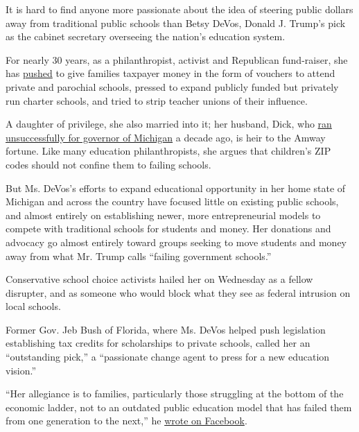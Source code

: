 It is hard to find anyone more passionate about the idea of steering
public dollars away from traditional public schools than Betsy DeVos,
Donald J. Trump's pick as the cabinet secretary overseeing the nation's
education system.

For nearly 30 years, as a philanthropist, activist and Republican
fund-raiser, she has
\href{http://www.nytimes.com/2016/11/23/upshot/why-donald-trumps-education-pick-would-face-barriers-for-vouchers.html?rref=collection\%2Fsectioncollection\%2Fupshot\&action=click\&contentCollection=upshot\&region=rank\&module=package\&version=highlights\&contentPlacement=2\&pgtype=sectionfront\&_r=0}{pushed}
to give families taxpayer money in the form of vouchers to attend
private and parochial schools, pressed to expand publicly funded but
privately run charter schools, and tried to strip teacher unions of
their influence.

A daughter of privilege, she also married into it; her husband, Dick,
who
\href{http://www.nytimes.com/2006/10/09/us/politics/09michigan.html}{ran
unsuccessfully for governor of Michigan} a decade ago, is heir to the
Amway fortune. Like many education philanthropists, she argues that
children's ZIP codes should not confine them to failing schools.

But Ms. DeVos's efforts to expand educational opportunity in her home
state of Michigan and across the country have focused little on existing
public schools, and almost entirely on establishing newer, more
entrepreneurial models to compete with traditional schools for students
and money. Her donations and advocacy go almost entirely toward groups
seeking to move students and money away from what Mr. Trump calls
``failing government schools.''

Conservative school choice activists hailed her on Wednesday as a fellow
disrupter, and as someone who would block what they see as federal
intrusion on local schools.

Former Gov. Jeb Bush of Florida, where Ms. DeVos helped push legislation
establishing tax credits for scholarships to private schools, called her
an ``outstanding pick,'' a ``passionate change agent to press for a new
education vision.''

``Her allegiance is to families, particularly those struggling at the
bottom of the economic ladder, not to an outdated public education model
that has failed them from one generation to the next,'' he
\href{https://www.facebook.com/jebbush/posts/1031443833651326}{wrote on
Facebook}.

